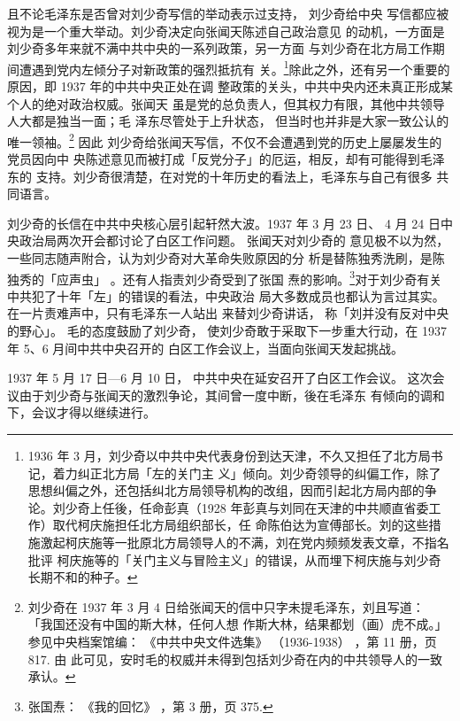 且不论毛泽东是否曾对刘少奇写信的举动表示过支持，
刘少奇给中央
写信都应被视为是一个重大举动。刘少奇决定向张闻天陈述自己政治意见
的动机，一方面是刘少奇多年来就不满中共中央的一系列政策，另一方面
与刘少奇在北方局工作期间遭遇到党内左倾分子对新政策的强烈抵抗有
关。\footnote{1936 年 3 月，刘少奇以中共中央代表身份到达天津，不久又担任了北方局书记，着力纠正北方局「左的关门主
义」倾向。刘少奇领导的纠偏工作，除了思想纠偏之外，还包括纠北方局领导机构的改组，因而引起北方局内部的争
论。刘少奇上任後，任命彭真（1928 年彭真与刘同在天津的中共顺直省委工作）取代柯庆施担任北方局组织部长，任
命陈伯达为宣傅部长。刘的这些措施激起柯庆施等一批原北方局领导人的不满，刘在党内频频发表文章，不指名批评
柯庆施等的「关门主义与冒险主义」的错误，从而埋下柯庆施与刘少奇长期不和的种子。}除此之外，还有另一个重要的原因，即 1937 年的中共中央正处在调
整政策的关头，中共中央内还未真正形成某个人的绝对政治权威。张闻天
虽是党的总负责人，但其权力有限，其他中共领导人大都是独当一面；毛
泽东尽管处于上升状态，
但当时也并非是大家一致公认的唯一领袖。\footnote{刘少奇在 1937 年 3 月 4 日给张闻天的信中只字未提毛泽东，刘且写道：
「我国还没有中国的斯大林，任何人想
作斯大林，结果都划（画）虎不成。」参见中央档案馆编：
《中共中央文件选集》
（1936-1938）
，第 11 册，页 817. 由
此可见，安时毛的权威并未得到包括刘少奇在内的中共领导人的一致承认。
} 因此
刘少奇给张闻天写信，不仅不会遭遇到党的历史上屡屡发生的党员因向中
央陈述意见而被打成「反党分子」的厄运，相反，却有可能得到毛泽东的
支持。刘少奇很清楚，在对党的十年历史的看法上，毛泽东与自己有很多
共同语言。

刘少奇的长信在中共中央核心层引起轩然大波。1937 年 3 月 23 日、
4 月 24 日中央政治局两次开会都讨论了白区工作问题。
张闻天对刘少奇的
意见极不以为然，一些同志随声附合，认为刘少奇对大革命失败原因的分
析是替陈独秀洗刷，是陈独秀的「应声虫」
。还有人指责刘少奇受到了张国
焘的影响。\footnote{张国焘：
《我的回忆》
，第 3 册，页 375.}对于刘少奇有关中共犯了十年「左」的错误的看法，中央政治
局大多数成员也都认为言过其实。在一片责难声中，只有毛泽东一人站出
来替刘少奇讲话， 称「刘并没有反对中央的野心」。 毛的态度鼓励了刘少奇，
使刘少奇敢于采取下一步重大行动，在 1937 年 5、6 月间中共中央召开的
白区工作会议上，当面向张闻天发起挑战。
 
1937 年 5 月 17 日—6 月 10 日，
中共中央在延安召开了白区工作会议。
这次会议由于刘少奇与张闻天的激烈争论，其间曾一度中断，後在毛泽东
有倾向的调和下，会议才得以继续进行。
 
